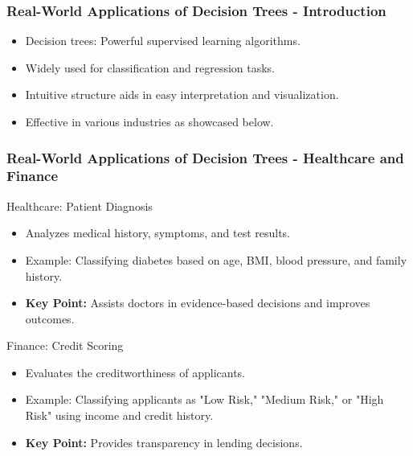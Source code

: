 \documentclass[aspectratio=169]{beamer}
\begin{document}
\begin{frame}[fragile]
    \frametitle{Real-World Applications of Decision Trees - Introduction}
    \begin{itemize}
        \item Decision trees: Powerful supervised learning algorithms.
        \item Widely used for classification and regression tasks.
        \item Intuitive structure aids in easy interpretation and visualization.
        \item Effective in various industries as showcased below.
    \end{itemize}
\end{frame}

\begin{frame}[fragile]
    \frametitle{Real-World Applications of Decision Trees - Healthcare and Finance}
    \begin{block}{Healthcare: Patient Diagnosis}
        \begin{itemize}
            \item Analyzes medical history, symptoms, and test results.
            \item Example: Classifying diabetes based on age, BMI, blood pressure, and family history.
            \item \textbf{Key Point:} Assists doctors in evidence-based decisions and improves outcomes.
        \end{itemize}
    \end{block}
    
    \begin{block}{Finance: Credit Scoring}
        \begin{itemize}
            \item Evaluates the creditworthiness of applicants.
            \item Example: Classifying applicants as "Low Risk," "Medium Risk," or "High Risk" using income and credit history.
            \item \textbf{Key Point:} Provides transparency in lending decisions.
        \end{itemize}
    \end{block}
\end{frame}
\end{document}
